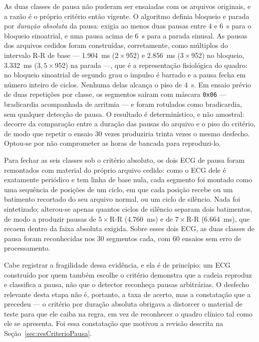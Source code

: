 As duas classes de pausa não puderam ser ensaiadas com os arquivos originais, e a razão é o
próprio critério então vigente. O algoritmo definia bloqueio e parada por \emph{duração
absoluta} da pausa: exigia ao menos duas pausas entre 4 e 6~s para o bloqueio sinoatrial, e
uma pausa acima de 6~s para a parada sinusal. As pausas dos arquivos cedidos foram
construídas, corretamente, como múltiplos do intervalo R-R de base --- 1.904~ms
($2\times$952) e 2.856~ms ($3\times$952) no bloqueio, 3.332~ms ($3{,}5\times$952) na parada
---, que é a representação fisiológica do quadro: no bloqueio sinoatrial de segundo grau o
impulso é barrado e a pausa fecha em número inteiro de ciclos. Nenhuma delas alcança o piso
de 4~s. Em ensaio prévio de duas repetições por classe, os segmentos saíram com máscara
\texttt{0x06} --- bradicardia acompanhada de arritmia --- e foram rotulados como
bradicardia, sem qualquer detecção de pausa. O resultado é determinístico, e não amostral:
decorre da comparação entre a duração das pausas do arquivo e o piso do critério, de modo
que repetir o ensaio 30 vezes produziria trinta vezes o mesmo desfecho. Optou-se por não
comprometer as horas de bancada para reproduzi-lo.

Para fechar as seis classes sob o critério absoluto, os dois \acs{ECG} de pausa foram
remontados com material do próprio arquivo cedido: como o \acs{ECG} dele é exatamente
periódico e tem linha de base nula, cada segmento foi montado como uma sequência de
posições de um ciclo, em que cada posição recebe ou um batimento recortado do seu arquivo
normal, ou um ciclo de silêncio. Nada foi sintetizado; alterou-se apenas quantos ciclos de
silêncio separam dois batimentos, de modo a produzir pausas de $5\times$R-R (4.760~ms) e de
$7\times$R-R (6.664~ms), que recaem dentro da faixa absoluta exigida. Sobre esses dois
\acs{ECG}, as duas classes de pausa foram reconhecidas nos 30 segmentos cada, com 60 ensaios
sem erro de processamento.

Cabe registrar a fragilidade dessa evidência, e ela é de princípio: um \acs{ECG} construído
por quem também escolhe o critério demonstra que a cadeia reproduz e classifica a pausa, não
que o detector reconheça pausas arbitrárias. O desfecho relevante desta etapa não é,
portanto, a taxa de acerto, mas a constatação que a precedeu --- o critério por duração
absoluta obrigava a distorcer o material de teste para que ele caiba na regra, em vez de
reconhecer o quadro clínico tal como ele se apresenta. Foi essa constatação que motivou a
revisão descrita na Seção~\ref{sec:resCriterioPausa}.


